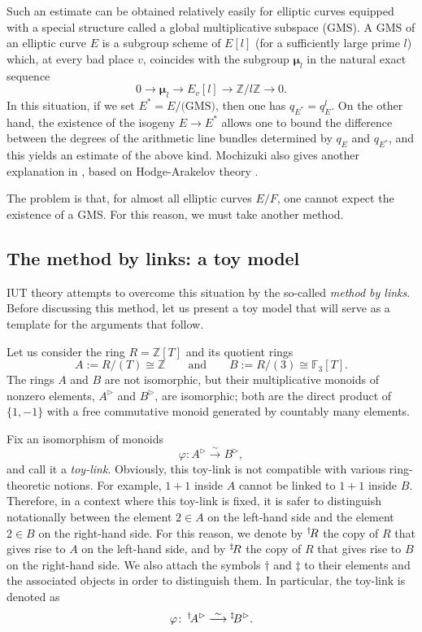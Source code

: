 \documentclass[12pt, reqno, a4paper]{amsart}
\def\simlongto{\stackrel{\sim}{\longrightarrow}} %
\def\bZ{\mathbb{Z}} %
\def\bF{\mathbb{F}} %
\def\bmu{\bm{\mu}}
\begin{document}
Such an estimate can be obtained relatively easily for elliptic curves equipped with a special structure called a global multiplicative subspace (GMS).
A GMS of an elliptic curve $E$ is a subgroup scheme of $E[l]$ (for a sufficiently large prime $l$) which, at every bad place $v$, coincides with the subgroup $\bmu_l$ in the natural exact sequence
\[
0\to \bmu_l\to E_v[l]\to \mathbb{Z}/l\mathbb{Z}\to 0.
\]
In this situation, if we set $E^*=E/\text{(GMS)}$, then one has $q_{E^*}=q_E^l$. On the other hand, the existence of the isogeny $E\to E^*$ allows one to bound the difference between the degrees of the arithmetic line bundles determined by $q_E$ and $q_{E^*}$, and this yields an estimate of the above kind. Mochizuki also gives another explanation in \cite[\S 1]{MR3408207}, based on Hodge-Arakelov theory \cite{MR1935421,MR1971513}.

The problem is that, for almost all elliptic curves $E/F$, one cannot expect the existence of a GMS.
For this reason, we must take another method.


\subsection{The method by links: a toy model}\label{sub:methodByLink}
IUT theory attempts to overcome this situation by the so-called {\it method by links}. 
Before discussing this method, let us present a toy model that will serve as a template for the arguments that follow.

Let us consider the ring $R=\bZ[T]$ and its quotient rings
\[
A:=R/(T)\cong \bZ
\qquad\text{and}\qquad
B:=R/(3)\cong \bF_3[T].
\]
The rings $A$ and $B$ are not isomorphic, but their multiplicative monoids of nonzero elements, $A^{\rhd}$ and $B^{\rhd}$, are isomorphic; both are the direct product of $\{1,-1\}$ with a free commutative monoid generated by countably many elements.

Fix an isomorphism of monoids
\[
\varphi\colon A^\rhd \simlongto B^\rhd,
\]
and call it a \emph{toy-link}.
Obviously, this toy-link is not compatible with various ring-theoretic notions. 
For example, $1+1$ inside $A$ cannot be linked to $1+1$ inside $B$.
Therefore, in a context where this toy-link is fixed, it is safer to distinguish notationally between the element $2\in A$ on the left-hand side and the element $2\in B$ on the right-hand side. For this reason, we denote by $\prescript\dag{}\!R$ the copy of $R$ that gives rise to $A$ on the left-hand side, and by $\prescript\ddag{}\!R$ the copy of $R$ that gives rise to $B$ on the right-hand side. We also attach the symbols $\dag$ and $\ddag$ to their elements and the associated objects in order to distinguish them.
In particular, the toy-link is denoted as
\[
\varphi\colon \prescript\dag{}\!A^{\rhd}\simlongto\prescript\ddag{}\!B^{\rhd}.
\]
\end{document}
